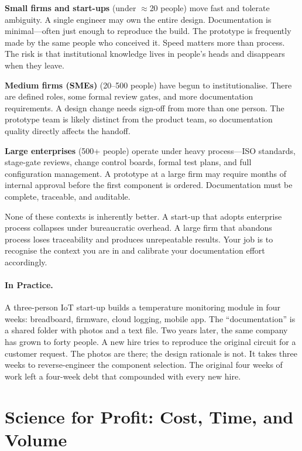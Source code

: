 \textbf{Small firms and start-ups} (under $\approx$20
people) move fast and tolerate ambiguity.
A single engineer may own the entire design.
Documentation is minimal---often just enough to reproduce the build.
The prototype is frequently made by the same people who conceived it.
Speed matters more than process.
The risk is that institutional knowledge lives in people's heads and
disappears when they leave.

\textbf{Medium firms (SMEs)} (20--500 people) have begun to
institutionalise.
There are defined roles, some formal review gates, and more documentation
requirements.
A design change needs sign-off from more than one person.
The prototype team is likely distinct from the product team, so
documentation quality directly affects the handoff.

\textbf{Large enterprises} (500+ people) operate
under heavy process---ISO standards, stage-gate reviews, change control
boards, formal test plans, and full configuration management.
A prototype at a large firm may require months of internal approval before
the first component is ordered.
Documentation must be complete, traceable, and auditable.

None of these contexts is inherently better.
A start-up that adopts enterprise process collapses under bureaucratic
overhead.
A large firm that abandons process loses traceability and produces
unrepeatable results.
Your job is to recognise the context you are in and calibrate your
documentation effort accordingly.

\paragraph{In Practice.}
A three-person IoT start-up builds a temperature monitoring module in four
weeks: breadboard, firmware, cloud logging, mobile app.
The ``documentation'' is a shared folder with photos and a text file.
Two years later, the same company has grown to forty people.
A new hire tries to reproduce the original circuit for a customer
request.
The photos are there; the design rationale is not.
It takes three weeks to reverse-engineer the component selection.
The original four weeks of work left a four-week debt that compounded
with every new hire.

\section{Science for Profit: Cost, Time, and Volume}
\label{sec:ch1-science-for-profit}

